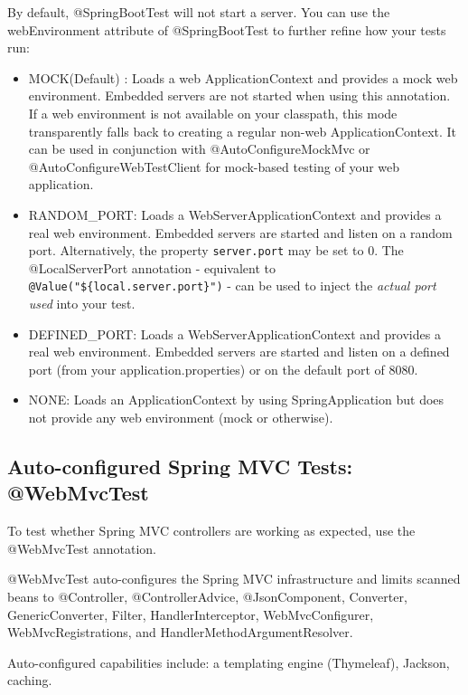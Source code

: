 \documentclass{scrartcl}
\begin{document}
By default, @SpringBootTest will not start a server. You can use the webEnvironment attribute of @SpringBootTest to further refine how your tests run:

\begin{itemize}
    \item MOCK(Default) : Loads a web ApplicationContext and provides a mock web environment. Embedded servers are not started when using this annotation. If a web environment is not available on your classpath, this mode transparently falls back to creating a regular non-web ApplicationContext. It can be used in conjunction with @AutoConfigureMockMvc or @AutoConfigureWebTestClient for mock-based testing of your web application.

    \item RANDOM\_PORT: Loads a WebServerApplicationContext and provides a real web environment. Embedded servers are started and listen on a random port.
    Alternatively, the property \lstinline|server.port| may be set to 0.
    The @LocalServerPort annotation - equivalent to  \lstinline|@Value("${local.server.port}")| - can be used to inject the \textit{actual port used} into your test.

    \item DEFINED\_PORT: Loads a WebServerApplicationContext and provides a real web environment. Embedded servers are started and listen on a defined port (from your application.properties) or on the default port of 8080.

    \item NONE: Loads an ApplicationContext by using SpringApplication but does not provide any web environment (mock or otherwise).
\end{itemize}

\subsection{Auto-configured Spring MVC Tests: @WebMvcTest}

To test whether Spring MVC controllers are working as expected, use the @WebMvcTest annotation.

@WebMvcTest auto-configures the Spring MVC infrastructure and limits scanned beans to @Controller, @ControllerAdvice, @JsonComponent, Converter, GenericConverter, Filter, HandlerInterceptor, WebMvcConfigurer, WebMvcRegistrations, and HandlerMethodArgumentResolver.

Auto-configured capabilities include: a templating engine (Thymeleaf), Jackson, caching.
\end{document}
